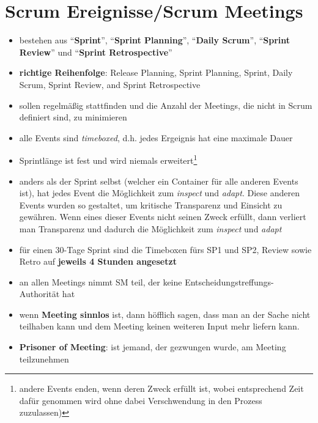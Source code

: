 \section{Scrum Ereignisse/Scrum Meetings}
\begin{itemize}
  \item bestehen aus \enquote{\textbf{Sprint}}, \enquote{\textbf{Sprint Planning}},
        \enquote{\textbf{Daily Scrum}}, \enquote{\textbf{Sprint Review}} und \enquote{\textbf{Sprint Retrospective}}
  \item \textbf{richtige Reihenfolge}: Release Planning, Sprint Planning, Sprint, Daily Scrum, Sprint Review, and Sprint Retrospective
  \item sollen regelmäßig stattfinden und die Anzahl der Meetings, die nicht
    in Scrum definiert sind, zu minimieren
  \item alle Events sind \textit{timeboxed}, d.h. jedes Ergeignis hat eine maximale Dauer
  \item Sprintlänge ist fest und wird niemals erweitert\footnote{andere Events enden, wenn deren Zweck
    erfüllt ist, wobei entsprechend Zeit dafür genommen wird ohne dabei Verschwendung in den
    Prozess zuzulassen)}
  \item anders als der Sprint selbst (welcher ein Container für alle anderen Events ist), hat
    jedes Event die Möglichkeit zum \textit{inspect} und \textit{adapt}. Diese anderen Events wurden so
    gestaltet, um kritische Transparenz und Einsicht zu gewähren. Wenn eines dieser Events
    nicht seinen Zweck erfüllt, dann verliert man Transparenz und dadurch die Möglichkeit
    zum \textit{inspect} und \textit{adapt}
  \item für einen 30-Tage Sprint sind die Timeboxen fürs SP1 und SP2, Review sowie Retro auf
    \textbf{jeweils 4 Stunden angesetzt}
  \item an allen Meetings nimmt SM teil, der keine Entscheidungstreffungs-Authorität hat
  \item wenn \textbf{Meeting sinnlos} ist, dann höfflich sagen, dass man an der Sache nicht
    teilhaben kann und dem Meeting keinen weiteren Input mehr liefern kann.
  \item \textbf{Prisoner of Meeting}: ist jemand, der gezwungen wurde, am Meeting teilzunehmen
\end{itemize}


